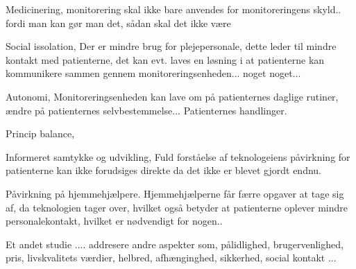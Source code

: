 Medicinering, 
monitorering skal ikke bare anvendes for monitoreringens skyld.. fordi man kan gør man det, sådan skal det ikke være

Social issolation, 
Der er mindre brug for plejepersonale, dette leder til mindre kontakt med patienterne, det kan evt. laves en løsning i at patienterne kan kommunikere sammen gennem monitoreringsenheden... noget noget...

Autonomi, 
Monitoreringsenheden kan lave om på patienternes daglige rutiner, ændre på patienternes selvbestemmelse... Patienternes handlinger.

Princip balance, 


Informeret samtykke og udvikling, 
Fuld forståelse af teknologeiens påvirkning for patienterne kan ikke forudsiges direkte da det ikke er blevet gjordt endnu.

Påvirkning på hjemmehjælpere.
Hjemmehjælperne får færre opgaver at tage sig af, da teknologien tager over, hvilket også betyder at patienterne oplever mindre personalekontakt, hvilket er nødvendigt for nogen..

\citep{Mittelstand2011}

Et andet studie .... addresere andre aspekter som, pålidlighed, brugervenlighed, pris, livskvalitets værdier, helbred, afhænginghed, sikkerhed, social kontakt ...